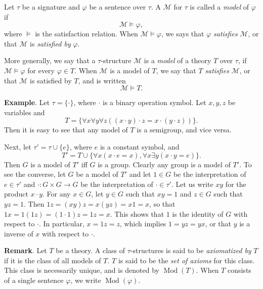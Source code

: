 \documentclass[12pt]{article}
\begin{document}
Let $\tau$ be a signature and $\varphi$ be a sentence over $\tau$.  A  $\mathcal{M}$ for $\tau$ is called a \emph{model} of $\varphi$ if $$\mathcal{M}\models \varphi,$$
where $\models$ is the satisfaction relation.  When $\mathcal{M}\models \varphi$, we says that $\varphi$ \emph{satisfies} $\mathcal{M}$, or that $\mathcal{M}$ is \emph{satisfied by} $\varphi$.

More generally, we say that a $\tau$-structure $\mathcal{M}$ is a \emph{model} of a theory $T$ over $\tau$, if $\mathcal{M}\models \varphi$ for every $\varphi\in T$.  When $\mathcal{M}$ is a model of $T$, we say that $T$ \emph{satisfies} $\mathcal{M}$, or that $\mathcal{M}$ is satisfied by $T$, and is written $$\mathcal{M}\models T.$$

\textbf{Example}.  Let $\tau=\lbrace \cdot \rbrace$, where $\cdot$ is a binary operation symbol.  Let $x,y,z$ be variables and $$T=\lbrace \forall x \forall y \forall z \left((x\cdot y)\cdot z=x\cdot (y\cdot z)\right) \rbrace.$$  Then it is easy to see that any model of $T$ is a semigroup, and vice versa.

Next, let $\tau'=\tau\cup \lbrace e\rbrace$, where $e$ is a constant symbol, and $$T'=T\cup \lbrace \forall x (x\cdot e=x), \forall x\exists y (x\cdot y=e)\rbrace.$$  Then $G$ is a model of $T'$ iff $G$ is a group.  Clearly any group is a model of $T'$.  To see the converse, let $G$ be a model of $T'$ and let $1\in G$ be the interpretation of $e\in \tau'$ and $\cdot:G\times G\to G$ be the interpretation of $\cdot\in \tau'$.  Let us write $xy$ for the product $x\cdot y$.  For any $x\in G$, let $y\in G$ such that $xy=1$ and $z\in G$ such that $yz=1$. Then $1z=(xy)z=x(yz)=x1=x$, so that $1x=1(1z)=(1\cdot 1)z=1z=x$.  This shows that $1$ is the identity of $G$ with respect to $\cdot$.  In particular, $x=1z=z$, which implies $1=yz=yx$, or that $y$ is a inverse of $x$ with respect to $\cdot$.

\textbf{Remark}.  Let $T$ be a theory.  A class of $\tau$-structures is said to be \emph{axiomatized by} $T$ if it is the class of all models of $T$.  $T$ is said to be the \emph{set of axioms} for this class.  This class is necessarily unique, and is denoted by $\operatorname{Mod}(T)$.  When $T$ consists of a single sentence $\varphi$, we write $\operatorname{Mod}(\varphi)$.


\end{document}
